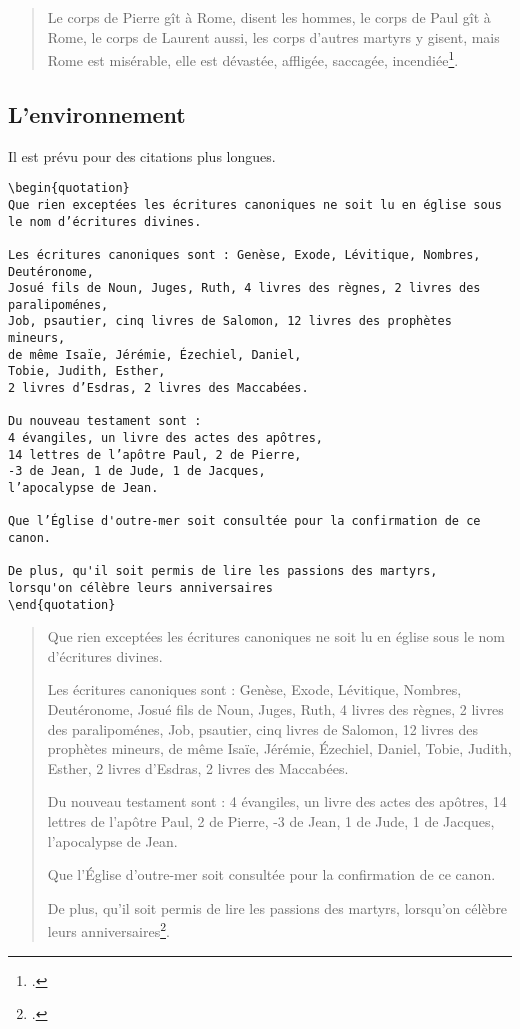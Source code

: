 	\begin{quote}
	Le corps de Pierre gît à Rome, disent les hommes, le corps de Paul gît à Rome, le corps de Laurent aussi, les corps d'autres martyrs y gisent, mais Rome est misérable, elle est dévastée, affligée, saccagée, incendiée\footcite[6]{AugustinSermo296}.
	\end{quote}

\subsection{L'environnement }

Il est prévu pour des citations plus longues.

\begin{verbatim}
\begin{quotation}
Que rien exceptées les écritures canoniques ne soit lu en église sous le nom d’écritures divines.

Les écritures canoniques sont : Genèse, Exode, Lévitique, Nombres, Deutéronome,
Josué fils de Noun, Juges, Ruth, 4 livres des règnes, 2 livres des paralipoménes,
Job, psautier, cinq livres de Salomon, 12 livres des prophètes mineurs,
de même Isaïe, Jérémie, Ézechiel, Daniel,
Tobie, Judith, Esther,
2 livres d’Esdras, 2 livres des Maccabées.

Du nouveau testament sont :
4 évangiles, un livre des actes des apôtres,
14 lettres de l’apôtre Paul, 2 de Pierre,
-3 de Jean, 1 de Jude, 1 de Jacques,
l’apocalypse de Jean.

Que l’Église d'outre-mer soit consultée pour la confirmation de ce canon.

De plus, qu'il soit permis de lire les passions des martyrs,
lorsqu'on célèbre leurs anniversaires
\end{quotation}
\end{verbatim}

	\begin{quotation}
Que rien exceptées les écritures canoniques ne soit lu en église sous le nom d’écritures divines.

Les écritures canoniques sont : Genèse, Exode, Lévitique, Nombres, Deutéronome,
Josué fils de Noun, Juges, Ruth, 4 livres des règnes, 2 livres des paralipoménes,
Job, psautier, cinq livres de Salomon, 12 livres des prophètes mineurs,
de même Isaïe, Jérémie, Ézechiel, Daniel,
Tobie, Judith, Esther,
2 livres d’Esdras, 2 livres des Maccabées.

Du nouveau testament sont :
4 évangiles, un livre des actes des apôtres,
14 lettres de l’apôtre Paul, 2 de Pierre,
-3 de Jean, 1 de Jude, 1 de Jacques,
l’apocalypse de Jean.

Que l’Église d'outre-mer soit consultée pour la confirmation de ce canon.

De plus, qu'il soit permis de lire les passions des martyrs,
lorsqu'on célèbre leurs anniversaires\footcite{BreveHippone}.

	\end{quotation}

